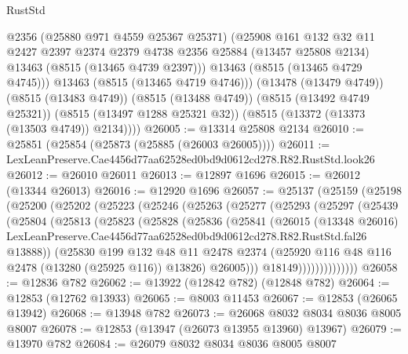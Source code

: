 \begin{lexlean}{RustStd}
\begin{coremodule}
            @2356
            (@25880 @971 @4559 @25367 @25371)
            (@25908
              @161
              @132
              @32
              @11
              @2427
              @2397
              @2374
              @2379
              @4738
              @2356
              @25884
              (@13457 @25808 @2134)
              @13463
              (@8515 (@13465 @4739 @2397)))
            @13463
            (@8515 (@13465 @4729 @4745)))
          @13463
          (@8515 (@13465 @4719 @4746)))
        (@13478 (@13479 @4749))
        (@8515 (@13483 @4749))
        (@8515 (@13488 @4749))
        (@8515 (@13492 @4749 @25321))
        (@8515 (@13497 @1288 @25321 @32))
        (@8515 (@13372 (@13373 (@13503 @4749)) @2134))))
@26005 := @13314 @25808 @2134
@26010 := @25851 (@25854 (@25873 (@25885 (@26003 @26005))))
@26011 := LexLeanPreserve.Cae4456d77aa62528ed0bd9d0612cd278.R82.RustStd.look26
@26012 := @26010 @26011
@26013 := @12897 @1696
@26015 := @26012 (@13344 @26013)
@26016 := @12920 @1696
@26057 := @25137
    (@25159
      (@25198
        (@25200
          (@25202
            (@25223
              (@25246
                (@25263
                  (@25277
                    (@25293
                      (@25297
                        (@25439
                          (@25804
                            (@25813
                              (@25823
                                (@25828
                                  (@25836
                                    (@25841
                                      (@26015
                                        (@13348 @26016)
                                        LexLeanPreserve.Cae4456d77aa62528ed0bd9d0612cd278.R82.RustStd.fal26
                                        @13888))
                                    (@25830
                                      @199
                                      @132
                                      @48
                                      @11
                                      @2478
                                      @2374
                                      (@25920 @116 @48 @116 @2478 (@13280 (@25925 @116)) @13826)
                                      @26005)))
                                @18149))))))))))))))
@26058 := @12836 @782
@26062 := @13922 (@12842 @782) (@12848 @782)
@26064 := @12853 (@12762 @13933)
@26065 := @8003 @11453
@26067 := @12853 (@26065 @13942)
@26068 := @13948 @782
@26073 := @26068 @8032 @8034 @8036 @8005 @8007
@26078 := @12853 (@13947 (@26073 @13955 @13960) @13967)
@26079 := @13970 @782
@26084 := @26079 @8032 @8034 @8036 @8005 @8007

\end{coremodule}
\end{lexlean}
